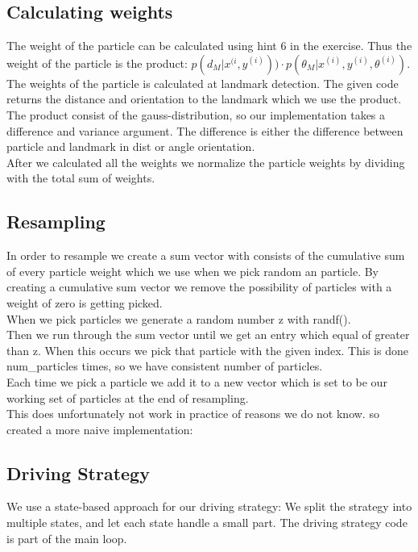 \documentclass[a4paper,12pt]{article}
\begin{document}
\subsection{Calculating weights}
The weight of the particle can be calculated using hint 6 in the exercise. Thus the weight of the particle is the product: $p(d_M | x^{(i}, y^{(i)})) \cdot  p(\theta_M |x^{(i)} , y^{(i)} , \theta^{(i)} ) $. \\
The weights of the particle is calculated at landmark detection. The given code returns the distance and orientation to the landmark which we use the product. \\
The product consist of the gauss-distribution, so our implementation takes a difference and variance argument. The difference is either the difference between particle and landmark in dist or angle orientation. \\
After we calculated all the weights we normalize the particle weights by dividing with the total sum of weights. \\
\subsection{Resampling}
In order to resample we create a sum vector with consists of the cumulative sum of every particle weight which we use when we pick random an particle. By creating a cumulative sum vector we remove the possibility of particles with a weight of zero is getting picked.\\
When we pick particles we generate a random number z with randf().\\
Then we run through the sum vector until we get an entry which equal of greater than z. When this occurs we pick that particle with the given index. This is done num\_particles times, so we have consistent number of particles.\\
Each time we pick a particle we add it to a new vector which is set to be our working set of particles at the end of resampling.\\
This does unfortunately not work in practice of reasons we do not know. so created a more naive implementation: 
 

\subsection{Driving Strategy}

We use a state-based approach for our driving strategy: We split the strategy
into multiple states, and let each state handle a small part.  The driving
strategy code is part of the main loop.
\end{document}
